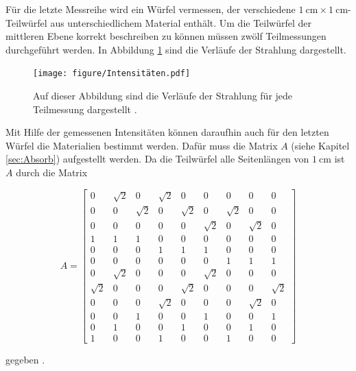 Für die letzte Messreihe wird ein Würfel vermessen, der verschiedene 
$\SI{1}{\centi\meter} \times \SI{1}{\centi\meter}$-Teilwürfel aus unterschiedlichem Material
enthält. Um die Teilwürfel der mittleren Ebene korrekt beschreiben zu können müssen 
zwölf Teilmessungen durchgeführt werden.
In Abbildung \ref{abb2} sind die Verläufe der Strahlung dargestellt.

\begin{figure}
	\centering
	\texttt{[image: figure/Intensitäten.pdf]}
	\caption{Auf dieser Abbildung sind die Verläufe der Strahlung für jede Teilmessung 
	dargestellt \cite{1}.}
	\label{abb2}
\end{figure}

Mit Hilfe der gemessenen Intensitäten können daraufhin auch für den letzten Würfel die 
Materialien bestimmt werden. Dafür muss die Matrix $A$ (siehe Kapitel \ref{sec:Absorb}) 
aufgestellt werden. Da die Teilwürfel alle Seitenlängen von 
$\SI{1}{\centi\meter}$ ist $A$ durch die Matrix 

\begin{equation}
	A = 	 
	\begin{bmatrix}
		0 		 & \sqrt{2}  & 0 		& \sqrt{2} & 0 		  & 0 		 & 0 		& 0 	   & 0\\
		0 		 & 0 		 & \sqrt{2} & 0 	   & \sqrt{2} & 0 		 & \sqrt{2} & 0 	   & 0   \\
		0 		 & 0 		 & 0 		& 0 	   & 0 		  & \sqrt{2} & 0 		& \sqrt{2} & 0 \\
		1 		 & 1 		 & 1 		& 0 	   & 0 		  & 0        & 0 		& 0 	   & 0  \\
		0 		 & 0 		 & 0 		& 1 	   & 1		  & 1		 & 0		& 0		   & 0  \\
		0 		 & 0 		 & 0 		& 0		   & 0		  & 0		 & 1		& 1		   & 1  \\
		0 		 & \sqrt{2}  & 0 		& 0		   & 0		  & \sqrt{2} & 0		& 0		   & 0 \\
		\sqrt{2} & 0 		 & 0 		& 0		   & \sqrt{2} & 0		 & 0		& 0		   & \sqrt{2} \\
		0 		 & 0 		 & 0 		& \sqrt{2} & 0		  & 0		 & 0		& \sqrt{2} & 0  \\ 
		0 		 & 0 		 & 1 		& 0		   & 0		  & 1		 & 0		& 0		   & 1\\
		0 		 & 1 		 & 0 		& 0		   & 1		  & 0		 & 0		& 1		   & 0  \\
		1 		 & 0 		 & 0 		& 1		   & 0		  & 0		 & 1		& 0		   & 0  
	\end{bmatrix}
\end{equation}

gegeben \cite{sample}.